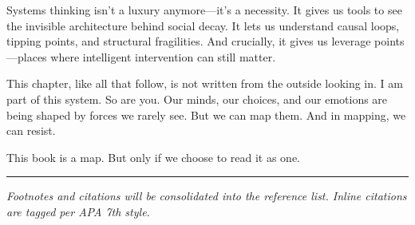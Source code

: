Systems thinking isn't a luxury anymore---it's a necessity. It gives us tools to see the invisible architecture behind social decay. It lets us understand causal loops, tipping points, and structural fragilities. And crucially, it gives us leverage points---places where intelligent intervention can still matter.

This chapter, like all that follow, is not written from the outside looking in. I am part of this system. So are you. Our minds, our choices, and our emotions are being shaped by forces we rarely see. But we can map them. And in mapping, we can resist.

This book is a map. But only if we choose to read it as one.

\begin{center}\rule{0.5\linewidth}{0.5pt}\end{center}

\emph{Footnotes and citations will be consolidated into the reference list. Inline citations are tagged per APA 7th style.}


